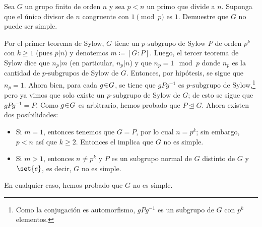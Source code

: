 \begin{ejer}
Sea $G$ un grupo finito de orden $n$ y sea $p < n$ un primo que divide a $n$. Suponga que el único divisor de $n$ congruente con $1\pmod{p}$ es $1$. Demuestre que $G$ no puede ser simple.
\end{ejer}
\begin{sol}[Demostración]
Por el primer teorema de Sylow, $G$ tiene un $p\text{-subgrupo}$ de Sylow $P$ de orden $p^k$ con $k \geq 1$ (pues $p|n$) y denotemos $m \coloneq [G:P]$. Luego, el tercer teorema de Sylow dice que $n_p|m$ (en particular, $n_p|n$) y que $n_p = 1\mod p$ donde $n_p$ es la cantidad de $p\text{-subgrupos}$ de Sylow de $G$. Entonces, por hipótesis, se sigue que $n_p = 1$. Ahora bien, para cada $g \en G$, se tiene que $gPg^{-1}$ es $p\text{-subgrupo}$ de Sylow,\footnote{Como la conjugación es automorfismo, $gPg^{-1}$ es un subgrupo de $G$ con $p^k$ elementos.} pero ya vimos que solo existe un $p\text{-subgrupo}$ de Sylow de $G$; de esto se sigue que $gPg^{-1} = P$. Como $g \en G$ es arbitrario, hemos probado que $P \trianglelefteq G$. Ahora existen dos posibilidades:
\begin{itemize}
    \item Si $m=1$, entonces tenemos que $G = P$, por lo cual $n = p^k$; sin embargo, $p < n$ así que $k \geq 2$. Entonces el  implica que $G$ no es simple.

    \item Si $m>1$, entonces $n \neq p^k$ y $P$ es un subgrupo normal de $G$ distinto de $G$ y $\set{e}$, es decir, $G$ no es simple.
\end{itemize}
En cualquier caso, hemos probado que $G$ no es simple.
\end{sol}\clearpage

